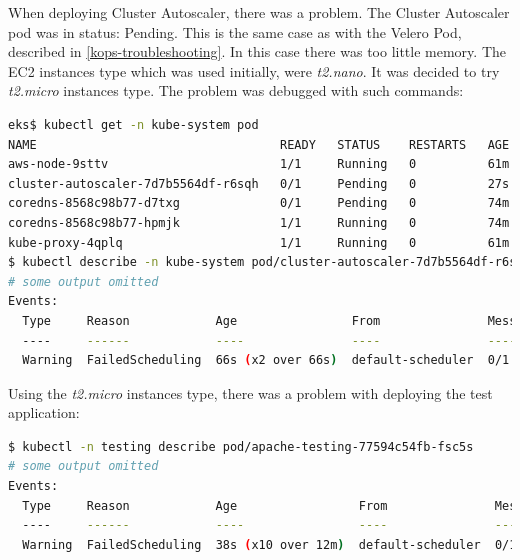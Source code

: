 When deploying Cluster Autoscaler, there was a problem. The Cluster Autoscaler pod was in status: Pending. This is the same case as with the Velero Pod, described in \ref{kops-troubleshooting}. In this case there was too little memory. The EC2 instances type which was used initially, were \textit{t2.nano}. It was decided to try \textit{t2.micro} instances type. The problem was debugged with such commands:
\begin{lstlisting}[basicstyle=\tiny,caption={Debugging cluster autoscaler},captionpos=b,language=Bash,xleftmargin=1cm]
eks$ kubectl get -n kube-system pod
NAME                                  READY   STATUS    RESTARTS   AGE
aws-node-9sttv                        1/1     Running   0          61m
cluster-autoscaler-7d7b5564df-r6sqh   0/1     Pending   0          27s
coredns-8568c98b77-d7txg              0/1     Pending   0          74m
coredns-8568c98b77-hpmjk              1/1     Running   0          74m
kube-proxy-4qplq                      1/1     Running   0          61m
$ kubectl describe -n kube-system pod/cluster-autoscaler-7d7b5564df-r6sqh
# some output omitted
Events:
  Type     Reason            Age                From               Message
  ----     ------            ----               ----               -------
  Warning  FailedScheduling  66s (x2 over 66s)  default-scheduler  0/1 nodes are available: 1 Insufficient memory.
\end{lstlisting}

Using the \textit{t2.micro} instances type, there was a problem with deploying the test application:
\begin{lstlisting}[basicstyle=\tiny,caption={Debugging a test application},captionpos=b,language=Bash,xleftmargin=1cm]
$ kubectl -n testing describe pod/apache-testing-77594c54fb-fsc5s
# some output omitted
Events:
  Type     Reason            Age                 From               Message
  ----     ------            ----                ----               -------
  Warning  FailedScheduling  38s (x10 over 12m)  default-scheduler  0/1 nodes are available: 1 Insufficient pods.
\end{lstlisting}


